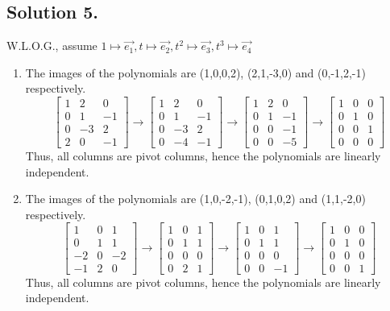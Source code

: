 \documentclass{article}
\begin{document}
\subsection*{Solution 5.}
W.L.O.G., assume $1\mapsto \vec{e_1},t\mapsto\vec{e_2},t^2\mapsto\vec{e_3},t^3\mapsto\vec{e_4}$
\begin{enumerate}
    \item The images of the polynomials are (1,0,0,2), (2,1,-3,0) and (0,-1,2,-1) respectively.
    \[\left[\begin{array}{ccc}1&2&0\\0&1&-1\\0&-3&2\\2&0&-1\end{array}\right]\rightarrow\left[\begin{array}{ccc}1&2&0\\0&1&-1\\0&-3&2\\0&-4&-1\end{array}\right]\rightarrow\left[\begin{array}{ccc}1&2&0\\0&1&-1\\0&0&-1\\0&0&-5\end{array}\right]\rightarrow\left[\begin{array}{ccc}1&0&0\\0&1&0\\0&0&1\\0&0&0\end{array}\right]\]
    Thus, all columns are pivot columns, hence the polynomials are linearly independent.
    \item The images of the polynomials are (1,0,-2,-1), (0,1,0,2) and (1,1,-2,0) respectively.
    \[\left[\begin{array}{ccc}1&0&1\\0&1&1\\-2&0&-2\\-1&2&0\end{array}\right]\rightarrow\left[\begin{array}{ccc}1&0&1\\0&1&1\\0&0&0\\0&2&1\end{array}\right]\rightarrow\left[\begin{array}{ccc}1&0&1\\0&1&1\\0&0&0\\0&0&-1\end{array}\right]\rightarrow\left[\begin{array}{ccc}1&0&0\\0&1&0\\0&0&0\\0&0&1\end{array}\right]\]
    Thus, all columns are pivot columns, hence the polynomials are linearly independent.
\end{enumerate}
\end{document}

